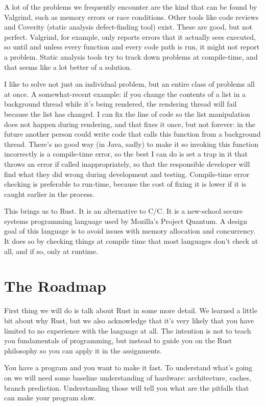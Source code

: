 \documentclass[a4paper]{report}
\newcommand{\CPP}{C\nolinebreak\hspace{-.05em}\raisebox{.4ex}{\tiny\bf +}\nolinebreak\hspace{-.10em}\raisebox{.4ex}{\tiny\bf +}}
\def\CPP{{C\nolinebreak[4]\hspace{-.05em}\raisebox{.4ex}{\tiny\bf ++}}}
\begin{document}
A lot of the problems we frequently encounter are the kind that can be found by Valgrind, such as memory errors or race conditions. Other tools like code reviews and Coverity (static analysis defect-finding tool) exist. These are good, but not perfect. Valgrind, for example, only reports errors that it actually sees executed, so until and unless every function and every code path is run, it might not report a problem. Static analysis tools try to track down problems at compile-time, and that seems like a lot better of a solution.


I like to solve not just an individual problem, but an entire class of problems all at once. A somewhat-recent example: if you change the contents of a list in a background thread while it's being rendered, the rendering thread will fail because the list has changed. I can fix the line of code so the list manipulation does not happen during rendering, and that fixes it once, but not forever: in the future another person could write code that calls this function from a background thread. There's no good way (in Java, sadly) to make it so invoking this function incorrectly is a compile-time error, so the best I can do is set a trap in it that throws an error if called inappropriately, so that the responsible developer will find what they did wrong during development and testing. Compile-time error checking is preferable to run-time, because the cost of fixing it is lower if it is caught earlier in the process.

This brings us to Rust. It is an alternative to C/\CPP. It is a new-school
secure systems programming language used by Mozilla's Project Quantum. A design goal of this language is to avoid issues with memory allocation and concurrency. It does so by checking things at compile time that most languages don't check at all, and if so, only at runtime.

\section*{The Roadmap}
First thing we will do is talk about Rust in some more detail. We learned a little bit about why Rust, but we also acknowledge that it's very likely that you have limited to no experience with the language at all. The intention is not to teach you fundamentals of programming, but instead to guide you on the Rust philosophy so you can apply it in the assignments. 

You have a program and you want to make it fast. To understand what's going on we will need some baseline understanding of hardware: architecture, caches, branch prediction. Understanding those will tell you what are the pitfalls that can make your program slow.
\end{document}
